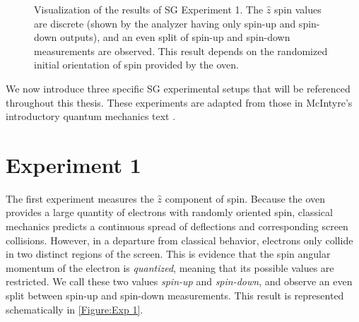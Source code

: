 \begin{figure}
\centering\CaptionFontSize
{}

\caption[Results of Stern-Gerlach Experiment 1]
{Visualization of the results of SG Experiment 1. The $\hat{z}$ spin values are discrete (shown by the analyzer having only spin-up and spin-down outputs), and an even split of spin-up and spin-down measurements are observed. This result depends on the randomized initial orientation of spin provided by the oven.}
\label{Figure:Exp 1}
\end{figure}

We now introduce three specific SG experimental setups that will be referenced throughout this thesis. These experiments are adapted from those in McIntyre's introductory quantum mechanics text \cite{mcintyre}.
\section{Experiment 1} \label{og experiment 1}
The first experiment measures the $\hat{z}$ component of spin. Because the oven provides a large quantity of electrons with randomly oriented spin, classical mechanics predicts a continuous spread of deflections and corresponding screen collisions. However, in a departure from classical behavior, electrons only collide in two distinct regions of the screen. This is evidence that the spin angular momentum of the electron is \textit{quantized}, meaning that its possible values are restricted. We call these two values \textit{spin-up} and \textit{spin-down}, and observe an even split between spin-up and spin-down measurements. This result is represented schematically in \autoref{Figure:Exp 1}.

